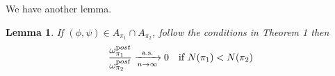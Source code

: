 \documentclass[aoas,preprint]{imsart}
\newtheorem{lemma}{Lemma}
\begin{document}



We have another lemma.
\begin{lemma}
 If $(\phi, \psi) \in A_{\pi_1} \cap A_{\pi_2}$, follow the conditions in Theorem 1 then 
 \begin{eqnarray*}
    \frac{\omega_{\pi_1}^{\text post}}{\omega_{\pi_2}^{\text post}} \xrightarrow[n\rightarrow\infty]{\text{a.s.}} 0 \quad \text{if } N(\pi_1) < N(\pi_2)\\
 \end{eqnarray*}
\end{lemma}
\end{document}

